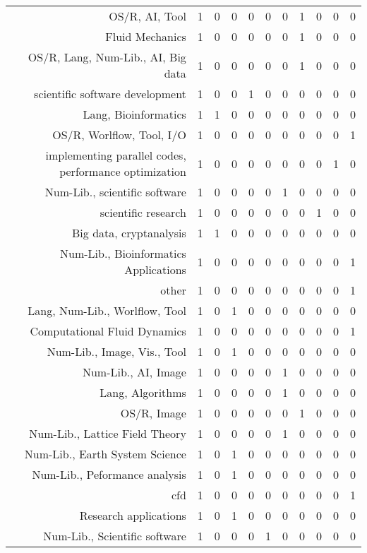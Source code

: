 {\begin{landscape}
\begin{longtable}[htb]{r|c|c|c|c|c|c|c|c|c|c}
{OS/R, AI, Tool} & 1 & 0 & 0 & 0 & 0 & 0 & 1 & 0 & 0 & 0 \\%
{Fluid Mechanics} & 1 & 0 & 0 & 0 & 0 & 0 & 1 & 0 & 0 & 0 \\%
{OS/R, Lang, Num-Lib., AI, Big data} & 1 & 0 & 0 & 0 & 0 & 0 & 1 & 0 & 0 & 0 \\%
{scientific software development} & 1 & 0 & 0 & 1 & 0 & 0 & 0 & 0 & 0 & 0 \\%
{Lang, Bioinformatics} & 1 & 1 & 0 & 0 & 0 & 0 & 0 & 0 & 0 & 0 \\%
{OS/R, Worlflow, Tool, I/O} & 1 & 0 & 0 & 0 & 0 & 0 & 0 & 0 & 0 & 1 \\%
{implementing parallel codes, performance optimization} & 1 & 0 & 0 & 0 & 0 & 0 & 0 & 0 & 1 & 0 \\%
{Num-Lib., scientific software} & 1 & 0 & 0 & 0 & 0 & 1 & 0 & 0 & 0 & 0 \\%
{scientific research} & 1 & 0 & 0 & 0 & 0 & 0 & 0 & 1 & 0 & 0 \\%
{Big data, cryptanalysis} & 1 & 1 & 0 & 0 & 0 & 0 & 0 & 0 & 0 & 0 \\%
{Num-Lib., Bioinformatics Applications} & 1 & 0 & 0 & 0 & 0 & 0 & 0 & 0 & 0 & 1 \\%
{other} & 1 & 0 & 0 & 0 & 0 & 0 & 0 & 0 & 0 & 1 \\%
{Lang, Num-Lib., Worlflow, Tool} & 1 & 0 & 1 & 0 & 0 & 0 & 0 & 0 & 0 & 0 \\%
{Computational Fluid Dynamics} & 1 & 0 & 0 & 0 & 0 & 0 & 0 & 0 & 0 & 1 \\%
{Num-Lib., Image, Vis., Tool} & 1 & 0 & 1 & 0 & 0 & 0 & 0 & 0 & 0 & 0 \\%
{Num-Lib., AI, Image} & 1 & 0 & 0 & 0 & 0 & 1 & 0 & 0 & 0 & 0 \\%
{Lang, Algorithms} & 1 & 0 & 0 & 0 & 0 & 1 & 0 & 0 & 0 & 0 \\%
{OS/R, Image} & 1 & 0 & 0 & 0 & 0 & 0 & 1 & 0 & 0 & 0 \\%
{Num-Lib., Lattice Field Theory} & 1 & 0 & 0 & 0 & 0 & 1 & 0 & 0 & 0 & 0 \\%
{Num-Lib., Earth System Science} & 1 & 0 & 1 & 0 & 0 & 0 & 0 & 0 & 0 & 0 \\%
{Num-Lib., Peformance analysis} & 1 & 0 & 1 & 0 & 0 & 0 & 0 & 0 & 0 & 0 \\%
{cfd} & 1 & 0 & 0 & 0 & 0 & 0 & 0 & 0 & 0 & 1 \\%
{Research applications} & 1 & 0 & 1 & 0 & 0 & 0 & 0 & 0 & 0 & 0 \\%
{Num-Lib., Scientific software} & 1 & 0 & 0 & 0 & 1 & 0 & 0 & 0 & 0 & 0 \\%

\end{longtable}
\end{landscape}}
